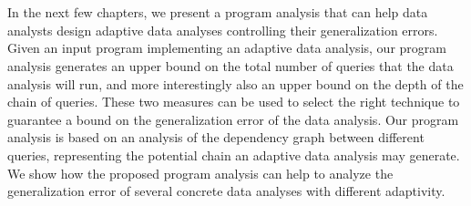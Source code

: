 


\chapter*{}

In the next few chapters, we present a program analysis that can help data analysts design adaptive data analyses controlling their generalization errors. Given an input program implementing an adaptive data analysis, our program analysis generates an upper bound on the total number of queries that the data analysis will run, and more interestingly also an upper bound on the depth of the chain of queries. These two measures can be used to select the right technique to guarantee a bound on the generalization error of the data analysis. Our program analysis is based on an analysis of the dependency graph between different queries, representing the potential chain an adaptive data analysis may generate. We show how the proposed program analysis can help to analyze the generalization error of several concrete data analyses with different adaptivity.